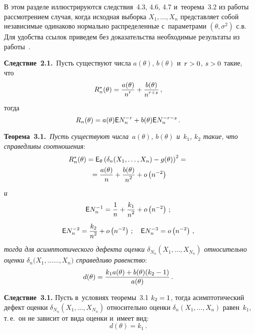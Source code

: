 \begin{multicols}{2}
В этом разделе иллюстрируются следствия~4.3, 4.6, 4.7 и~теорема~3.2 
из работы~\cite{2-ben}
рассмотрением случая, когда исходная выборка $X_1,\ldots,X_n$ представляет 
собой независимые одинаково нормально распределенные 
с~параметрами $(\theta, \sigma^2)$ с.в. Для удобства ссылок 
приведем без доказательства необходимые результаты из работы~\cite{2-ben}.

\smallskip

\noindent
\textbf{Следствие~2.1.}\ {Пусть существуют числа $a(\theta)$,
$b(\theta)$ и~$r\hm > 0$, $s\hm > 0$ такие, что}
$$
R^*_n(\theta) = \displaystyle\frac{\displaystyle a(\theta)\mathstrut}{\displaystyle n^r\mathstrut} + \displaystyle\frac{\displaystyle b(\theta)\mathstrut}{\displaystyle n^{r+s}\mathstrut}\,,
$$
{тогда}
$$
R_n(\theta) = a(\theta) {\sf E} N_n^{-r} + b(\theta) {\sf E} N_n^{-r-s}\,.
$$


\noindent
\textbf{Теорема~3.1.}\ \textit{Пусть существуют числа~$a(\theta)$,
$b(\theta)$ и~$k_1$, $k_2$ такие, что справедливы соотношения}:
\begin{multline*}
R^*_n(\theta) = {\sf E}_\theta\left(\delta_{n}(X_1,\ldots,X_{n}) 
- g(\theta)\right)^2 ={}\\
{}= \displaystyle\frac{\displaystyle a(\theta)\mathstrut}{\displaystyle n\mathstrut} + \displaystyle\frac{\displaystyle b(\theta)\mathstrut}{\displaystyle n^2\mathstrut} + o \left(n^{-2}\right)
\end{multline*}
\textit{и}
$$
{\sf E} N_n^{-1} = \displaystyle\frac{\displaystyle 1\mathstrut}{\displaystyle n\mathstrut} + \displaystyle\frac{\displaystyle k_1\mathstrut}{\displaystyle n^2\mathstrut} + o \left(n^{-2}\right)\,;
$$
$$
{\sf E} N_n^{-2} = \displaystyle\frac{\displaystyle k_2\mathstrut}{\displaystyle n^2\mathstrut} + o\left(n^{-2}\right)\,;\quad 
{\sf E} N_n^{-3} = o \left(n^{-2}\right)\,,
$$
\textit{тогда для асимптотического дефекта оценки 
$\delta_{N_n}(X_1,\ldots,X_{N_n})$ относительно 
оценки $\delta_n(X_1,\ldots$\linebreak $\ldots,X_n)$ справедливо равенство}:
$$
d(\theta) = \displaystyle\frac{\displaystyle k_1 a(\theta) + b(\theta) (k_2 - 1)\mathstrut}{\displaystyle a(\theta)\mathstrut}\,.
$$


\noindent
\textbf{Следствие~3.1.} Пусть в~условиях теоремы~3.1 $k_2\hm = 1$, тогда
асимптотический дефект оценки $\delta_{N_n}(X_1,\ldots,X_{N_n})$ 
относительно оценки $\delta_n(X_1,\ldots,X_n)$ равен~$k_1$, т.\,е.\ 
он не зависит от вида оценки и~имеет вид:
$$
d(\theta) = k_1\,.
$$



\end{multicols}
